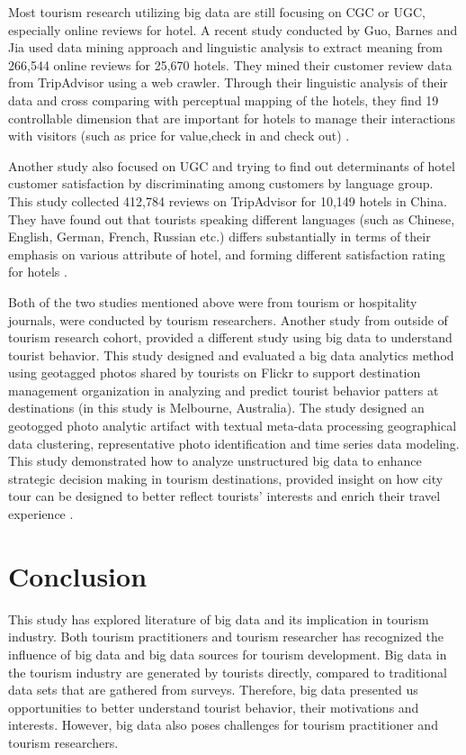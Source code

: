 \documentclass[sigconf]{acmart}
\begin{document}
Most tourism research utilizing big data are still focusing on CGC or UGC, especially online reviews for hotel. A recent study conducted by Guo, Barnes and Jia used data mining approach and linguistic analysis to extract meaning from 266,544 online reviews for 25,670 hotels. They mined their customer review data from TripAdvisor using a web crawler. Through their linguistic analysis of their data and cross comparing with perceptual mapping of the hotels, they find 19 controllable dimension that are important for hotels to manage their interactions with visitors (such as price for value,check in and check out) \cite{GUO2017467}.

Another study also focused on UGC and trying to find out determinants of hotel customer satisfaction by discriminating among customers by language group. This study collected 412,784 reviews on TripAdvisor for 10,149 hotels in China. They have found out that tourists speaking different languages (such as Chinese, English, German, French, Russian etc.) differs substantially in terms of their emphasis on various attribute of hotel, and forming different satisfaction rating for hotels \cite{LIU2017554}.

Both of the two studies mentioned above were from tourism or hospitality journals, were conducted by tourism researchers. Another study from outside of tourism research cohort, provided a different study using big data to understand tourist behavior. This study designed and evaluated a big data analytics method using geotagged photos shared by tourists on Flickr to support destination management organization in analyzing and predict tourist behavior patters at destinations (in this study is Melbourne, Australia). The study designed an geotogged photo analytic artifact with textual meta-data processing geographical data clustering, representative photo identification and time series data modeling. This study demonstrated how to analyze unstructured big data to enhance strategic decision making in tourism destinations, provided insight on how city tour can be designed to better reflect tourists' interests and enrich their travel experience \cite{MIAH2017}. 


\section{Conclusion}
This study has explored literature of big data and its implication in tourism industry. Both tourism practitioners and tourism researcher has recognized the influence of big data and big data sources for tourism development. Big data in the tourism industry are generated by tourists directly, compared to traditional data sets that are gathered from surveys. Therefore, big data presented us opportunities to better understand tourist behavior, their motivations and interests. However, big data also poses challenges for tourism practitioner and tourism researchers. 
\end{document}
